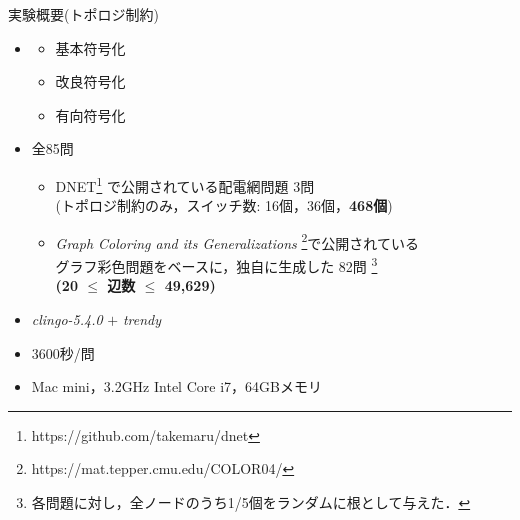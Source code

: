 \documentclass[dvipdfmx,11pt]{beamer}
\begin{document}
\begin{frame}{実験概要(トポロジ制約)}
  \renewcommand{\thefootnote}{\fnsymbol{footnote}}
  \setcounter{footnote}{1}
  \begin{itemize}
  \item {}
    \begin{itemize}
     \item 基本符号化
     \item 改良符号化
     \item 有向符号化
    \end{itemize}
  \item {} 全85問
    \begin{itemize}
    \item DNET\footnote{https://github.com/takemaru/dnet}%
      で公開されている配電網問題 3問 \\ (トポロジ制約のみ，スイッチ数:
      16個，36個，\textbf{468個})
    \item \textit{Graph Coloring and its Generalizations}
      \footnote{https://mat.tepper.cmu.edu/COLOR04/}で公開されている \\
      グラフ彩色問題をベースに，独自に生成した 82問 
      \footnote{各問題に対し，全ノードのうち1/5個をランダムに根として与えた．}\\
      \alert{\bf (20 $\leq$ 辺数 $\leq$ 49,629)}
    \end{itemize}
  \item {} \textit{clingo-5.4.0} $+$ \textit{trendy}
  \item {} 3600秒/問
  \item {} Mac mini，3.2GHz Intel Core i7，64GBメモリ
  \end{itemize}
\end{frame}
\end{document}
